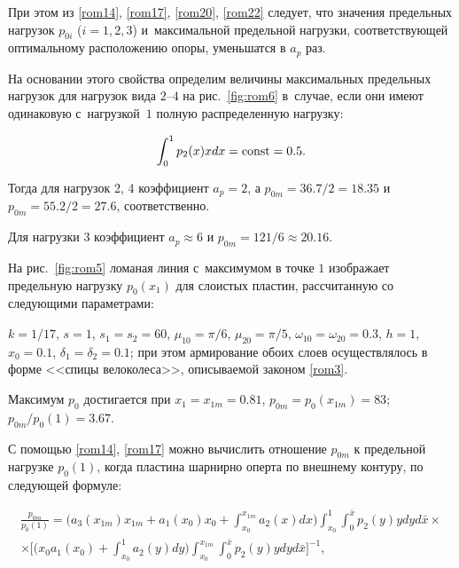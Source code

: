 При этом из \eqref{rom14}, \eqref{rom17}, \eqref{rom20}, \eqref{rom22} следует, что значения предельных нагрузок $p_{0i}$ ($i=1, 2, 3$) и~максимальной предельной нагрузки, соответствующей оптимальному расположению опоры, уменьшатся в $a_p$ раз.

На основании этого свойства определим величины максимальных предельных нагрузок для нагрузок вида $2$--$4$ на рис.~\ref{fig:rom6} в~случае, если они имеют одинаковую с~нагрузкой~$1$ полную распределенную нагрузку:

$$

\int_0^1{p_2(x)x}dx={\rm const}=0.5.

$$

Тогда для нагрузок 2, 4 коэффициент $a_p=2$, а $p_{0m}=36.7/2=18.35$ и $p_{0m}=55.2/2=27.6$, соответственно.

Для нагрузки 3 коэффициент $a_p\approx6$ и $p_{0m}=121/6\approx20.16$.



На рис.~\ref{fig:rom5} ломаная линия с~максимумом в точке $1$ изображает предельную нагрузку $p_0(x_1)$ для слоистых пластин, рассчитанную  со следующими параметрами:

$k=1/17$, $s=1$, $s_1=s_2=60$, $\mu_{10}=\pi/6$, $\mu_{20}=\pi/5$, $\omega_{10}=\omega_{20}=0.3$, $h=1$, $x_0=0.1$, $\delta_1=\delta_2=0.1$; при этом армирование обоих слоев осуществлялось в форме <<спицы велоколеса>>, описываемой законом \eqref{rom3}.

Максимум $p_0$ достигается при $x_1=x_{1m}=0.81$, $p_{0m}=p_0(x_{1m})=83$; $p_{0m}/p_0(1)=3.67$.



С помощью \eqref{rom14}, \eqref{rom17} можно вычислить отношение $p_{0m}$ к предельной нагрузке $p_0(1)$, когда пластина шарнирно оперта по внешнему контуру, по следующей формуле:

\begin{multline}

\frac{p_{0m}}{p_0(1)}

=

\biggl(a_3(x_{1m})x_{1m}+a_1(x_0)x_0+\int_{x_0}^{x_{1m}} a_2(x) dx\biggr)

\int_{x_0}^1 \int_0^{\bar{x}} p_2(y)y dy  d\bar{x}

\times

\\

\times

\biggl[\biggl( x_0a_1(x_0)+\int_{x_0}^1{a_2(y)}dy\biggr) \int_{x_0}^{x_{1m}}

\int_0^{\bar{x}} p_2(y)y dy

 d\bar{x}\biggr]^{-1},

\end{multline}

